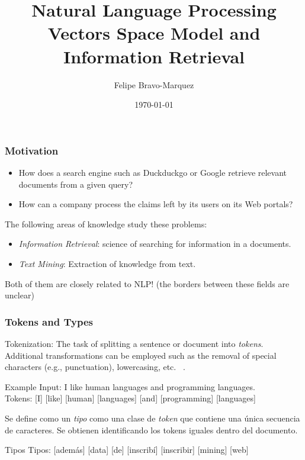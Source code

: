 \documentclass[handout]{beamer}
\title{Natural Language Processing \\ Vectors Space Model and Information Retrieval}
\author[Felipe Bravo Márquez]{\footnotesize
 \textcolor[rgb]{0.00,0.00,1.00}{Felipe Bravo-Marquez}}
\date{\today}
\begin{document}
\begin{frame}
\titlepage


\end{frame}

\begin{frame}\frametitle{Motivation}


  \begin{itemize}
   \item How does a search engine such as Duckduckgo or Google retrieve relevant documents from a given query?
   \item How can a company process the claims left by its users on its Web portals?
  \end{itemize}

The following areas of knowledge study these problems:

\begin{itemize}
 \item \emph{Information Retrieval}:  science of searching for information in a documents.
 \item \emph{Text Mining}: Extraction of knowledge from text.
\end{itemize}

Both of them are closely related to NLP! (the borders between these fields are unclear)

\end{frame}

\begin{frame}\frametitle{Tokens and Types}
{\footnotesize
Tokenization: The task of splitting a sentence or document into \emph{tokens}. \\
Additional transformations can be employed such as the removal of special characters (e.g., punctuation), lowercasing, etc. ~\cite{manning2008}. 

\begin{block}{Example}
Input: I like human languages and programming languages.\\
Tokens: [I] [like] [human] [languages] [and] [programming] [languages]
\end{block}

Se define como un \emph{tipo} como una clase de \emph{token} que contiene una única secuencia de caracteres.
Se obtienen identificando los tokens iguales dentro del documento.

\begin{block}{Tipos}
Tipos: [además] [data] [de] [inscribí] [inscribir] [mining] [web]   \\
\end{block}



 }
\end{frame}
\end{document}
